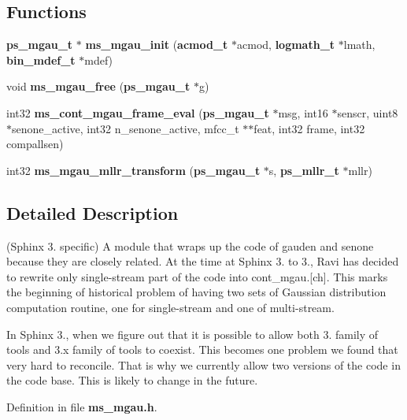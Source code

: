 \subsection*{Functions}
\begin{DoxyCompactItemize}
\item 
{\bf ps\-\_\-mgau\-\_\-t} $\ast$ {\bfseries ms\-\_\-mgau\-\_\-init} ({\bf acmod\-\_\-t} $\ast$acmod, {\bf logmath\-\_\-t} $\ast$lmath, {\bf bin\-\_\-mdef\-\_\-t} $\ast$mdef)\label{ms__mgau_8h_a7dbdcb8e1901665b955e324eefdfeea3}

\item 
void {\bfseries ms\-\_\-mgau\-\_\-free} ({\bf ps\-\_\-mgau\-\_\-t} $\ast$g)\label{ms__mgau_8h_ae553fda1fe6082d50cb95b06a85b2be6}

\item 
int32 {\bfseries ms\-\_\-cont\-\_\-mgau\-\_\-frame\-\_\-eval} ({\bf ps\-\_\-mgau\-\_\-t} $\ast$msg, int16 $\ast$senscr, uint8 $\ast$senone\-\_\-active, int32 n\-\_\-senone\-\_\-active, mfcc\-\_\-t $\ast$$\ast$feat, int32 frame, int32 compallsen)\label{ms__mgau_8h_ab1f5637b68fdc1a4d24e4d6275353216}

\item 
int32 {\bfseries ms\-\_\-mgau\-\_\-mllr\-\_\-transform} ({\bf ps\-\_\-mgau\-\_\-t} $\ast$s, {\bf ps\-\_\-mllr\-\_\-t} $\ast$mllr)\label{ms__mgau_8h_ad3fe464ff15e735bfef15e628c5433fc}

\end{DoxyCompactItemize}


\subsection{Detailed Description}
(Sphinx 3. specific) A module that wraps up the code of gauden and senone because they are closely related. At the time at Sphinx 3. to 3., Ravi has decided to rewrite only single-\/stream part of the code into cont\-\_\-mgau.[ch]. This marks the beginning of historical problem of having two sets of Gaussian distribution computation routine, one for single-\/stream and one of multi-\/stream.

In Sphinx 3., when we figure out that it is possible to allow both 3. family of tools and 3.\-x family of tools to coexist. This becomes one problem we found that very hard to reconcile. That is why we currently allow two versions of the code in the code base. This is likely to change in the future. 

Definition in file {\bf ms\-\_\-mgau.\-h}.

